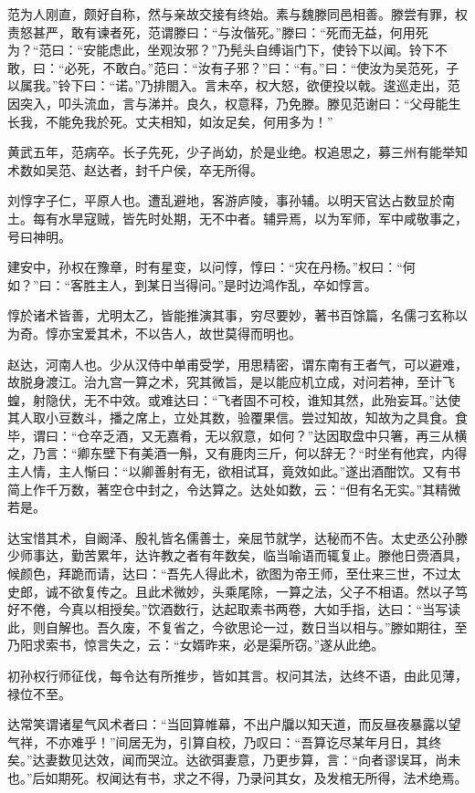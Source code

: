 \documentclass[12pt,UTF8]{ctexbook}
\begin{document}
范为人刚直，颇好自称，然与亲故交接有终始。素与魏滕同邑相善。滕尝有罪，权责怒甚严，敢有谏者死，范谓滕曰：“与汝偕死。”滕曰：“死而无益，何用死为？“范曰：“安能虑此，坐观汝邪？”乃髡头自缚诣门下，使铃下以闻。铃下不敢，曰：“必死，不敢白。”范曰：“汝有子邪？”曰：“有。”曰：“使汝为吴范死，子以属我。”铃下曰：“诺。”乃排閤入。言未卒，权大怒，欲便投以戟。逡巡走出，范因突入，叩头流血，言与涕并。良久，权意释，乃免滕。滕见范谢曰：“父母能生长我，不能免我於死。丈夫相知，如汝足矣，何用多为！”

黄武五年，范病卒。长子先死，少子尚幼，於是业绝。权追思之，募三州有能举知术数如吴范、赵达者，封千户侯，卒无所得。

刘惇字子仁，平原人也。遭乱避地，客游庐陵，事孙辅。以明天官达占数显於南土。每有水旱寇贼，皆先时处期，无不中者。辅异焉，以为军师，军中咸敬事之，号曰神明。

建安中，孙权在豫章，时有星变，以问惇，惇曰：“灾在丹杨。”权曰：“何如？”曰：“客胜主人，到某日当得问。”是时边鸿作乱，卒如惇言。

惇於诸术皆善，尤明太乙，皆能推演其事，穷尽要妙，著书百馀篇，名儒刁玄称以为奇。惇亦宝爱其术，不以告人，故世莫得而明也。

赵达，河南人也。少从汉侍中单甫受学，用思精密，谓东南有王者气，可以避难，故脱身渡江。治九宫一算之术，究其微旨，是以能应机立成，对问若神，至计飞蝗，射隐伏，无不中效。或难达曰：“飞者固不可校，谁知其然，此殆妄耳。”达使其人取小豆数斗，播之席上，立处其数，验覆果信。尝过知故，知故为之具食。食毕，谓曰：“仓卒乏酒，又无嘉肴，无以叙意，如何？”达因取盘中只箸，再三从横之，乃言：“卿东壁下有美酒一斛，又有鹿肉三斤，何以辞无？“时坐有他宾，内得主人情，主人惭曰：“以卿善射有无，欲相试耳，竟效如此。”遂出酒酣饮。又有书简上作千万数，著空仓中封之，令达算之。达处如数，云：“但有名无实。”其精微若是。

达宝惜其术，自阚泽、殷礼皆名儒善士，亲屈节就学，达秘而不告。太史丞公孙滕少师事达，勤苦累年，达许教之者有年数矣，临当喻语而辄复止。滕他日赍酒具，候颜色，拜跪而请，达曰：“吾先人得此术，欲图为帝王师，至仕来三世，不过太史郎，诚不欲复传之。且此术微妙，头乘尾除，一算之法，父子不相语。然以子笃好不倦，今真以相授矣。”饮酒数行，达起取素书两卷，大如手指，达曰：“当写读此，则自解也。吾久废，不复省之，今欲思论一过，数日当以相与。”滕如期往，至乃阳求索书，惊言失之，云：“女婿昨来，必是渠所窃。”遂从此绝。

初孙权行师征伐，每令达有所推步，皆如其言。权问其法，达终不语，由此见薄，禄位不至。

达常笑谓诸星气风术者曰：“当回算帷幕，不出户牖以知天道，而反昼夜暴露以望气祥，不亦难乎！”间居无为，引算自校，乃叹曰：“吾算讫尽某年月日，其终矣。”达妻数见达效，闻而哭泣。达欲弭妻意，乃更步算，言：“向者谬误耳，尚未也。”后如期死。权闻达有书，求之不得，乃录问其女，及发棺无所得，法术绝焉。
\end{document}
